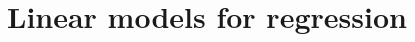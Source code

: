 \documentclass[usenames,dvipsnames,aspectratio=169]{beamer}
\begin{document}






\section{Linear models for regression}


\end{document}
